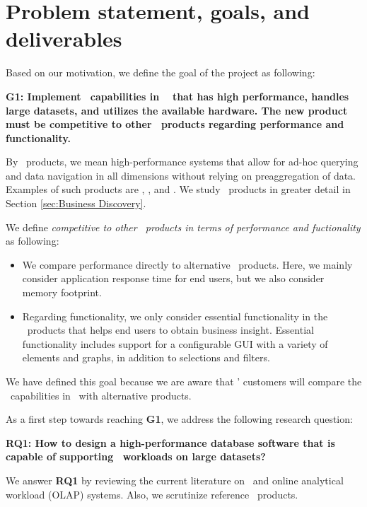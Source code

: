 \section{Problem statement, goals, and deliverables}
\label{sec:problem-statement-and-goals}
Based on our motivation, we define the goal of the project as following: 

\textbf{G1: Implement \bd~capabilities in \genusSoftware~ that has high performance, handles large datasets, and utilizes the available hardware. The new product must be competitive to other \bd~products regarding performance and functionality.}

By \bd~products, we mean high-performance systems that allow for ad-hoc querying and data navigation in all dimensions without relying on preaggregation of data. Examples of such products are \qlikview, \tableau, and \powerpivot. We study \bd~products in greater detail in Section \ref{sec:Business Discovery}.

We define \textit{competitive to other \bd~products in terms of performance and fuctionality} as following:
\begin{itemize}
  \item We compare performance directly to alternative \bd~products. Here, we mainly consider application response time for end users, but we also consider memory footprint.
  \item Regarding functionality, we only consider essential functionality in the \bd~products that helps end users to obtain business insight. Essential functionality includes support for a configurable GUI with a variety of elements and graphs, in addition to selections and filters.
\end{itemize}

We have defined this goal because we are aware that \genus' customers will compare the \bd~capabilities in \genusSoftware~with alternative products. 

As a first step towards reaching \textbf{G1}, we address the following research question:

\textbf{RQ1: How to design a high-performance database software that is capable of supporting \bd~workloads on large datasets?} 

We answer \textbf{RQ1} by reviewing the current literature on \bi~and online analytical workload (OLAP) systems. Also, we scrutinize reference \bd~products.
